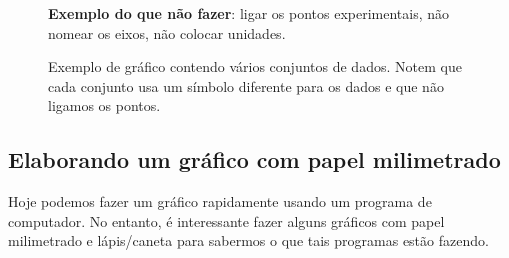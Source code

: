 \begin{figure}
\centering
\forcerectofloat

\caption{\textbf{Exemplo do que não fazer}: ligar os pontos experimentais, não nomear os eixos, não colocar unidades.}
\label{GraficoErrado}
\end{figure}

\begin{figure}
\centering
\forcerectofloat
\label{ExemploGrafico}

\caption{Exemplo de gráfico contendo vários conjuntos de dados. Notem que cada conjunto usa um símbolo diferente para os dados e que não ligamos os pontos.}
\end{figure}

\subsection{Elaborando um gráfico com papel milimetrado}

Hoje podemos fazer um gráfico rapidamente usando um programa de computador. No entanto, é interessante fazer alguns gráficos com papel milimetrado e lápis/caneta para sabermos o que tais programas estão fazendo.

